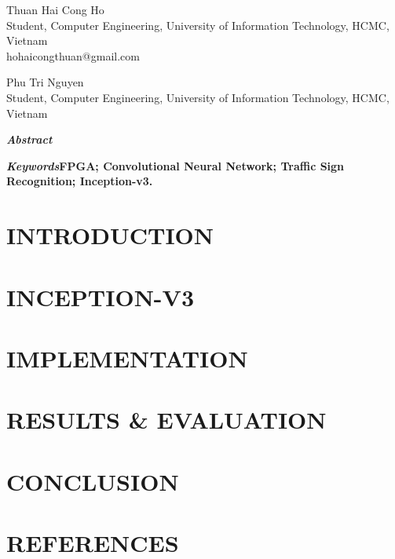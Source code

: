 \documentclass[a4paper, 10pt]{paper}
\begin{document}
    \title{}
    \author{}
    \maketitle %

    \begin{multicols}{2}
        \begin{center}
            Thuan Hai Cong Ho\\
            Student, Computer Engineering, University of Information Technology, HCMC, Vietnam\\
            hohaicongthuan@gmail.com
        \end{center}
        \begin{center}
            Phu Tri Nguyen\\
            Student, Computer Engineering, University of Information Technology, HCMC, Vietnam
        \end{center}
    \end{multicols}

    \begin{multicols}{2}
        
        \textbf{\textit{Abstract\textemdash}}

        \textbf{}
        
        \bigskip

        \textbf{\textit{Keywords\textemdash}FPGA; Convolutional Neural Network; Traffic Sign Recognition; Inception-v3.}

        \section{INTRODUCTION}

        \section{INCEPTION-V3}

        \section{IMPLEMENTATION}

        \section{RESULTS \& EVALUATION}

        \section{CONCLUSION}

        \section*{REFERENCES}

    \end{multicols}
\end{document}
